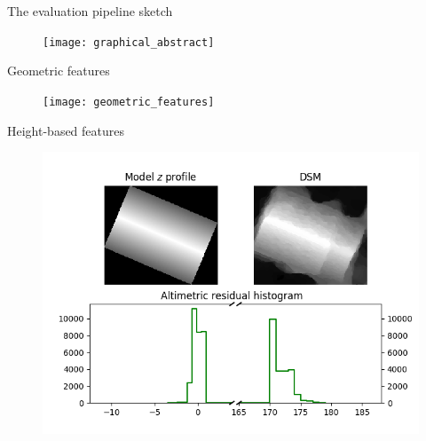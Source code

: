 \documentclass[10pt, export]{beamer}
\begin{document}
        \begin{frame}{The evaluation pipeline sketch}
            \begin{figure}
                \texttt{[image: graphical\_abstract]}
            \end{figure}
        \end{frame}
        \begin{frame}{Geometric features}
            \begin{figure}
                \texttt{[image: geometric\_features]}
            \end{figure}
        \end{frame}
        \begin{frame}{Height-based features}
            \begin{figure}
                \includegraphics[height=.7\textheight]{images/altimetric_features}
            \end{figure}
        \end{frame}
\end{document}
